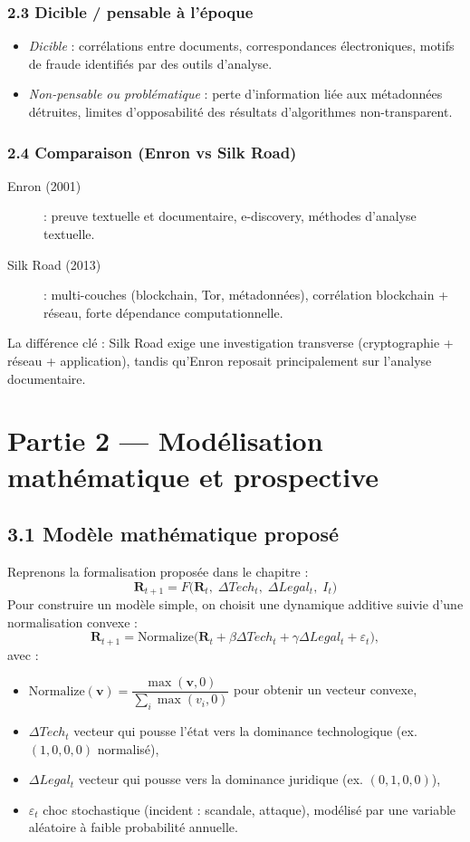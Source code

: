 \documentclass[12pt,a4paper]{article}
\begin{document}
\subsubsection{2.3 Dicible / pensable à l'époque}
\begin{itemize}
  \item \emph{Dicible} : corrélations entre documents, correspondances électroniques, motifs de fraude identifiés par des outils d'analyse.
  \item \emph{Non-pensable ou problématique} : perte d'information liée aux métadonnées détruites, limites d'opposabilité des résultats d'algorithmes non-transparent.
\end{itemize}

\subsubsection{2.4 Comparaison (Enron vs Silk Road)}
\begin{description}
  \item[Enron (2001)] : preuve textuelle et documentaire, e-discovery, méthodes d'analyse textuelle.
  \item[Silk Road (2013)] : multi-couches (blockchain, Tor, métadonnées), corrélation blockchain + réseau, forte dépendance computationnelle.
\end{description}
La différence clé : Silk Road exige une investigation transverse (cryptographie + réseau + application), tandis qu'Enron reposait principalement sur l'analyse documentaire.

\clearpage
\section{Partie 2 — Modélisation mathématique et prospective}

\subsection{3.1 Modèle mathématique proposé}
Reprenons la formalisation proposée dans le chapitre :
\[
\mathbf{R}_{t+1} = F\big(\mathbf{R}_t,\; \Delta Tech_t,\; \Delta Legal_t,\; I_t\big)
\]
Pour construire un modèle simple, on choisit une dynamique additive suivie d'une normalisation convexe :
\[
\mathbf{R}_{t+1} = \mathrm{Normalize}\Big(\mathbf{R}_t + \beta \Delta Tech_t + \gamma \Delta Legal_t + \varepsilon_t \Big),
\]
avec :
\begin{itemize}
  \item $\mathrm{Normalize}(\mathbf{v}) = \dfrac{\max(\mathbf{v},0)}{\sum_i \max(v_i,0)}$ pour obtenir un vecteur convexe,
  \item $\Delta Tech_t$ vecteur qui pousse l'état vers la dominance technologique (ex. $(1,0,0,0)$ normalisé),
  \item $\Delta Legal_t$ vecteur qui pousse vers la dominance juridique (ex. $(0,1,0,0)$),
  \item $\varepsilon_t$ choc stochastique (incident : scandale, attaque), modélisé par une variable aléatoire à faible probabilité annuelle.
\end{itemize}
\end{document}
